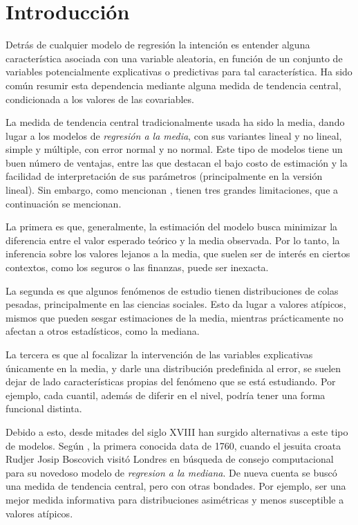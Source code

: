 \chapter{Introducci\'on}

Detr\'as de cualquier modelo de regresi\'on la intenci\'on es entender alguna caracter\'istica asociada con una variable aleatoria, en funci\'on de un conjunto de variables potencialmente explicativas o predictivas para tal caracter\'istica. Ha sido com\'un resumir esta dependencia mediante alguna medida de tendencia central, condicionada a los valores de las covariables.

La medida de tendencia central tradicionalmente usada ha sido la media, dando lugar a los modelos de \textit{regresi\'on a la media}, con sus variantes lineal y no lineal, simple y m\'ultiple, con error normal y no normal. Este tipo de modelos tiene un buen n\'umero de ventajas, entre las que destacan el bajo costo de estimaci\'on y la facilidad de interpretaci\'on de sus par\'ametros (principalmente en la versi\'on lineal). Sin embargo, como mencionan \cite{Hao_FrecQuantReg}, tienen tres grandes limitaciones, que a continuaci\'on se mencionan.

La primera es que, generalmente, la estimaci\'on del modelo busca minimizar la diferencia entre el valor esperado te\'orico y la media observada. Por lo tanto, la inferencia sobre los valores lejanos a la media, que suelen ser de inter\'es en ciertos contextos, como los seguros o las finanzas, puede ser inexacta.

La segunda es que algunos fen\'omenos de estudio tienen distribuciones de colas pesadas, principalmente en las ciencias sociales. Esto da lugar a valores at\'ipicos, mismos que pueden sesgar estimaciones de la media, mientras prácticamente no afectan a otros estadísticos, como la mediana.

La tercera es que al focalizar la intervenci\'on de las variables explicativas \'unicamente en la media, y darle una distribución predefinida al error, se suelen dejar de lado caracter\'isticas propias del fen\'omeno que se est\'a estudiando. Por ejemplo, cada cuantil, adem\'as de diferir en el nivel, podr\'ia tener una forma funcional distinta.

Debido a esto, desde mitades del siglo XVIII han surgido alternativas a este tipo de modelos. Seg\'un \cite{Hao_FrecQuantReg}, la primera conocida data de 1760, cuando el jesuita croata Rudjer Josip Boscovich visit\'o Londres en b\'usqueda de consejo computacional para su novedoso modelo de \textit{regresi\’on a la mediana}. De nueva cuenta se busc\'o una medida de tendencia central, pero con otras bondades. Por ejemplo, ser una mejor medida informativa para distribuciones asim\'etricas y menos susceptible a valores at\'ipicos. 


